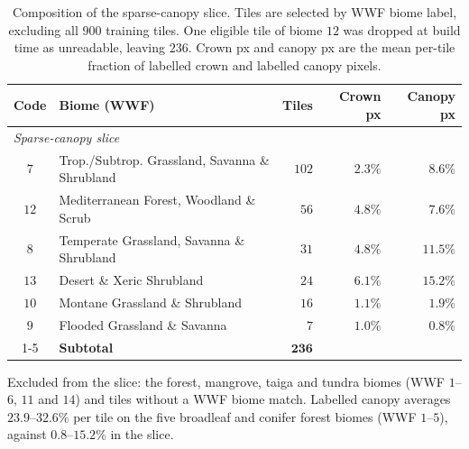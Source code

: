 \documentclass[remotesensing,article,submit,moreauthors]{Definitions/mdpi}
\begin{document}
\begin{table}[H]
\centering
\caption{Composition of the sparse-canopy slice. Tiles are selected by WWF biome label, excluding all $900$ training tiles. One eligible tile of biome $12$ was dropped at build time as unreadable, leaving $236$. Crown px and canopy px are the mean per-tile fraction of labelled crown and labelled canopy pixels.}
\label{tab:sparse-biomes}
\setlength{\tabcolsep}{4pt}
\begin{tabular}{@{}clrrr@{}}
\toprule
Code & Biome (WWF) & Tiles & Crown px & Canopy px \\
\midrule
\multicolumn{5}{l}{\emph{Sparse-canopy slice}} \\
$7$ & Trop./Subtrop. Grassland, Savanna \& Shrubland & $102$ & $2.3\%$ & $8.6\%$ \\
$12$ & Mediterranean Forest, Woodland \& Scrub & $56$ & $4.8\%$ & $7.6\%$ \\
$8$ & Temperate Grassland, Savanna \& Shrubland & $31$ & $4.8\%$ & $11.5\%$ \\
$13$ & Desert \& Xeric Shrubland & $24$ & $6.1\%$ & $15.2\%$ \\
$10$ & Montane Grassland \& Shrubland & $16$ & $1.1\%$ & $1.9\%$ \\
$9$ & Flooded Grassland \& Savanna & $7$ & $1.0\%$ & $0.8\%$ \\
\cmidrule(lr){1-5}
 & \textbf{Subtotal} & $\mathbf{236}$ &  & \\
\bottomrule
\end{tabular}

\vspace{3pt}
\begin{minipage}{0.95\textwidth}
\footnotesize
Excluded from the slice: the forest, mangrove, taiga and tundra biomes (WWF $1$--$6$, $11$ and $14$) and tiles without a WWF biome match. Labelled canopy averages $23.9$--$32.6\%$ per tile on the five broadleaf and conifer forest biomes (WWF $1$--$5$), against $0.8$--$15.2\%$ in the slice.
\end{minipage}
\end{table}
\end{document}
